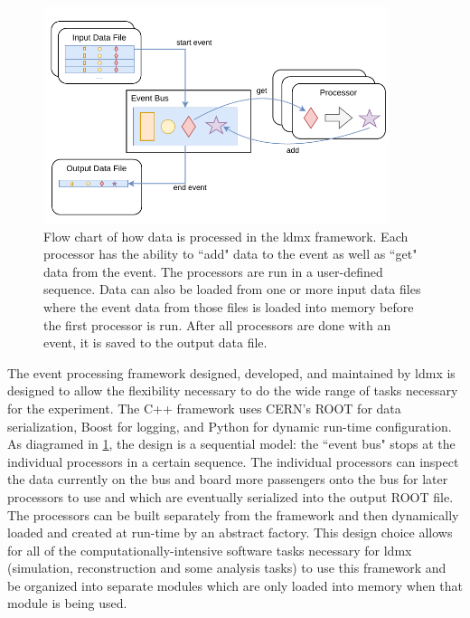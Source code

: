 \begin{figure}
  \centering
  \includegraphics[width=0.9\textwidth]{figures/ldmx/simulation/FrameworkFlowChart.drawio.pdf}
  \caption{Flow chart of how data is processed in the \ac{ldmx} framework. Each processor has the ability to ``add" data to the event as well as ``get" data from the event. The processors are run in a user-defined sequence. Data can also be loaded from one or more input data files where the event data from those files is loaded into memory before the first processor is run. After all processors are done with an event, it is saved to the output data file.}
  \label{fig:ldmx:sim:data-flow}
\end{figure}

The event processing framework designed, developed, and maintained by \ac{ldmx} is designed to
allow the flexibility necessary to do the wide range of tasks necessary for the experiment. The C++
framework uses CERN's ROOT \cite{cernroot} for data serialization, Boost  for logging, and Python \cite{python} for dynamic run-time
configuration. As diagramed in \cref{fig:ldmx:sim:data-flow}, the design is a sequential model: the
``event bus" stops at the individual processors in a certain sequence. The individual processors
can inspect the data currently on the bus and board more passengers onto the bus for later
processors to use and which are eventually serialized into the output ROOT file. The processors can
be built separately from the framework and then dynamically loaded and created at run-time by an
abstract factory. This design choice allows for all of the computationally-intensive software tasks
necessary for \ac{ldmx} (simulation, reconstruction and some analysis tasks) to use this framework
and be organized into separate modules which are only loaded into memory when that module is being
used.

